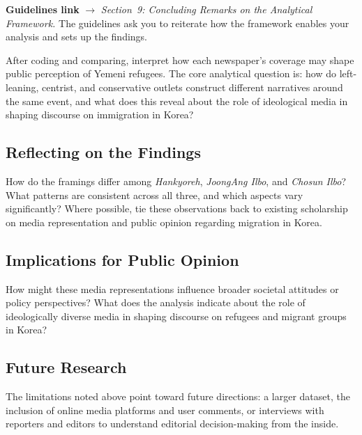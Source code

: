 \documentclass[11pt,a4paper]{article}
\begin{document}
\begin{crossrefbox}
\textbf{Guidelines link} $\rightarrow$ \textit{Section~9: Concluding Remarks on the Analytical Framework.} The guidelines ask you to reiterate how the framework enables your analysis and sets up the findings.
\end{crossrefbox}

\medskip

After coding and comparing, interpret how each newspaper's coverage may shape public perception of Yemeni refugees. The core analytical question is: how do left-leaning, centrist, and conservative outlets construct different narratives around the same event, and what does this reveal about the role of ideological media in shaping discourse on immigration in Korea?

\subsection{Reflecting on the Findings}

How do the framings differ among \textit{Hankyoreh}, \textit{JoongAng Ilbo}, and \textit{Chosun Ilbo}? What patterns are consistent across all three, and which aspects vary significantly? Where possible, tie these observations back to existing scholarship on media representation and public opinion regarding migration in Korea.

\subsection{Implications for Public Opinion}

How might these media representations influence broader societal attitudes or policy perspectives? What does the analysis indicate about the role of ideologically diverse media in shaping discourse on refugees and migrant groups in Korea?

\subsection{Future Research}

The limitations noted above point toward future directions: a larger dataset, the inclusion of online media platforms and user comments, or interviews with reporters and editors to understand editorial decision-making from the inside.

\vspace{1em}
\end{document}
